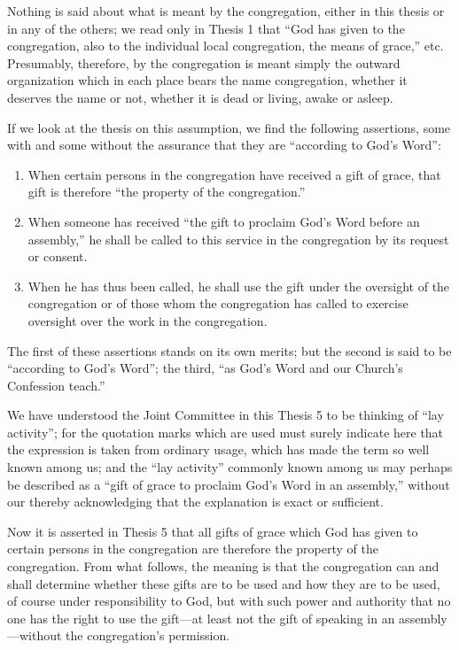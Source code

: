 Nothing is said about what is meant by the congregation, either in this thesis or in any of the others; we read only in Thesis 1 that “God has given to the congregation, also to the individual local congregation, the means of grace,” etc. Presumably, therefore, by the congregation is meant simply the outward organization which in each place bears the name congregation, whether it deserves the name or not, whether it is dead or living, awake or asleep.

If we look at the thesis on this assumption, we find the following assertions, some with and some without the assurance that they are “according to God’s Word”:

\begin{enumerate}

\item When certain persons in the congregation have received a gift of grace, that gift is therefore “the property of the congregation.”


\item When someone has received “the gift to proclaim God’s Word before an assembly,” he shall be called to this service in the congregation by its request or consent.


\item When he has thus been called, he shall use the gift under the oversight of the congregation or of those whom the congregation has called to exercise oversight over the work in the congregation.

\end{enumerate}

The first of these assertions stands on its own merits; but the second is said to be “according to God’s Word”; the third, “as God’s Word and our Church’s Confession teach.”

We have understood the Joint Committee in this Thesis 5 to be thinking of “lay activity”; for the quotation marks which are used must surely indicate here that the expression is taken from ordinary usage, which has made the term so well known among us; and the “lay activity” commonly known among us may perhaps be described as a “gift of grace to proclaim God’s Word in an assembly,” without our thereby acknowledging that the explanation is exact or sufficient.

Now it is asserted in Thesis 5 that all gifts of grace which God has given to certain persons in the congregation are therefore the property of the congregation. From what follows, the meaning is that the congregation can and shall determine whether these gifts are to be used and how they are to be used, of course under responsibility to God, but with such power and authority that no one has the right to use the gift—at least not the gift of speaking in an assembly—without the congregation’s permission.

